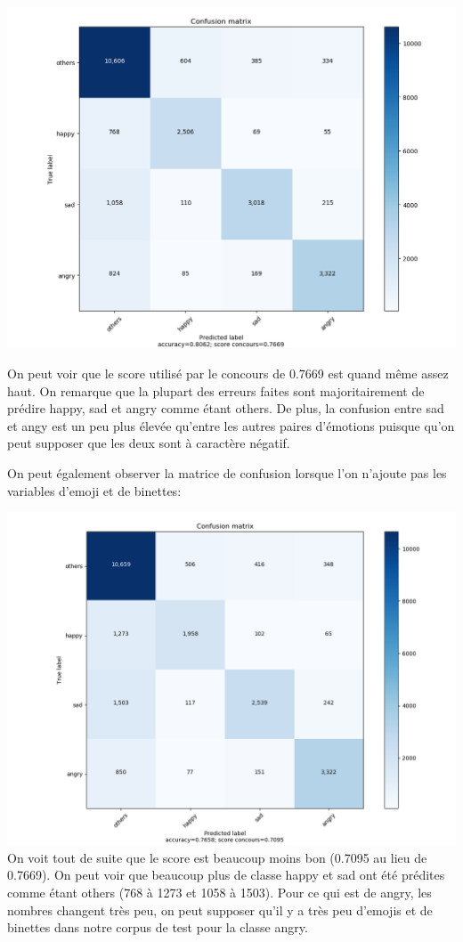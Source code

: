 \documentclass[12pt,french]{article}
\begin{document}
\includegraphics[width=\linewidth,keepaspectratio]{confusion_matrix_avec_features}

On peut voir que le score utilisé par le concours de 0.7669 est quand même assez haut. On remarque que la plupart des erreurs faites sont majoritairement de prédire happy, sad et angry comme étant others. De plus, la confusion entre sad et angy est un peu plus élevée qu'entre les autres paires d'émotions puisque qu'on peut supposer que les deux sont à caractère négatif.

On peut également observer la matrice de confusion lorsque l'on n'ajoute pas les variables d'emoji et de binettes:

\includegraphics[width=\linewidth,keepaspectratio]{confusion_matrix_sans_features}
On voit tout de suite que le score est beaucoup moins bon (0.7095 au lieu de 0.7669). On peut voir que beaucoup plus de classe happy et sad ont été prédites comme étant others (768 à 1273 et 1058 à 1503). Pour ce qui est de angry, les nombres changent très peu, on peut  supposer qu'il y a très peu d'emojis et de binettes dans notre corpus de test pour la classe angry.
\end{document}
